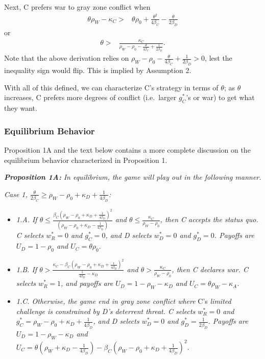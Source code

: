 \documentclass[
]{article}
\begin{document}
Next, C prefers war to gray zone conflict when
\begin{align*}
  \theta\rho_{W}-\kappa_{C}> & \theta\rho_{0}+\frac{\theta^{2}}{4\beta_{C}}-\frac{\theta}{2\beta_{D}}
  \end{align*}
or
\begin{align*}
  \theta> & \frac{\kappa_{C}}{\rho_{W}-\rho_{0}-\frac{\theta}{4\beta_{C}}+\frac{1}{2\beta_{D}}}.
  \end{align*}
Note that the above derivation relies on \(\rho_{W}-\rho_{0}-\frac{\theta}{4\beta_{C}}+\frac{1}{2\beta_{D}}>0\), lest the inequality sign would flip. This is implied by Assumption 2.

With all of this defined, we can characterize C's strategy in terms of \(\theta\); as \(\theta\) increases, C prefers more degrees of conflict (i.e.~larger \(g_{C}^{*}\)'s or war) to get what they want.

\hypertarget{equilibrium-behavior}{%
\subsubsection{Equilibrium Behavior}\label{equilibrium-behavior}}

Proposition 1A and the text below contains a more complete discussion on the equilibrium behavior characterized in Proposition 1.

\textbf{\textit{Proposition 1A:}}\textit{ In equilibrium, the game will play out in the following manner.}

\textit{Case 1, $\frac{\theta}{2\beta_{C}}\geq\rho_{W}-\rho_{0}+\kappa_{D}+\frac{1}{4\beta_{D}}$:}

\begin{itemize}
  \item \textit{1.A. If $\theta\leq\frac{\beta_{C}\left(\rho_{W}-\rho_{0}+\kappa_{D}+\frac{1}{4\beta_{D}}\right)^{2}}{\left(\rho_{W}-\rho_{0}+\kappa_{D}-\frac{1}{4\beta_{D}}\right)}$ and $\theta\leq\frac{\kappa_{C}}{\rho_{W}-\rho_{0}}$, then C accepts the status quo. C selects $w_{R}^{*}=0$ and $g_{C}^{*}=0$, and D selects $w_{D}^{*}=0$ and $g_{D}^{*}=0$. Payoffs are $U_{D}=1-\rho_{0}$ and $U_{C}=\theta\rho_{0}.$} 
  \item \textit{1.B. If $\theta>\frac{\kappa_{C}-\beta_{C}\left(\rho_{W}-\rho_{0}+\kappa_{D}+\frac{1}{4\beta_{D}}\right)^{2}}{\frac{1}{4\beta_{D}}-\kappa_{D}}$ and $\theta>\frac{\kappa_{C}}{\rho_{W}-\rho_{0}}$, then C declares war. C selects $w_{R}^{*}=1$, and payoffs are $U_{D}=1-\rho_{W}-\kappa_{D}$ and $U_{C}=\theta\rho_{W}-\kappa_{A}$.} 
  \item \textit{1.C. Otherwise, the game end in gray zone conflict where }C's\textit{ limited challenge is constrained by D's deterrent threat. C selects $w_{R}^{*}=0$ and $g_{C}^{*}=\rho_{W}-\rho_{0}+\kappa_{D}+\frac{1}{4\beta_{D}}$, and D selects $w_{D}^{*}=0$ and $g_{D}^{*}=\frac{1}{2\beta_{D}}$. Payoffs are $U_{D}=1-\rho_{W}-\kappa_{D}$ and $U_{C}=\theta\left(\rho_{W}+\kappa_{D}-\frac{1}{4\beta_{D}}\right)-\beta_{C}\left(\rho_{W}-\rho_{0}+\kappa_{D}+\frac{1}{4\beta_{D}}\right)^{2}.$} 
  \end{itemize}
\end{document}
